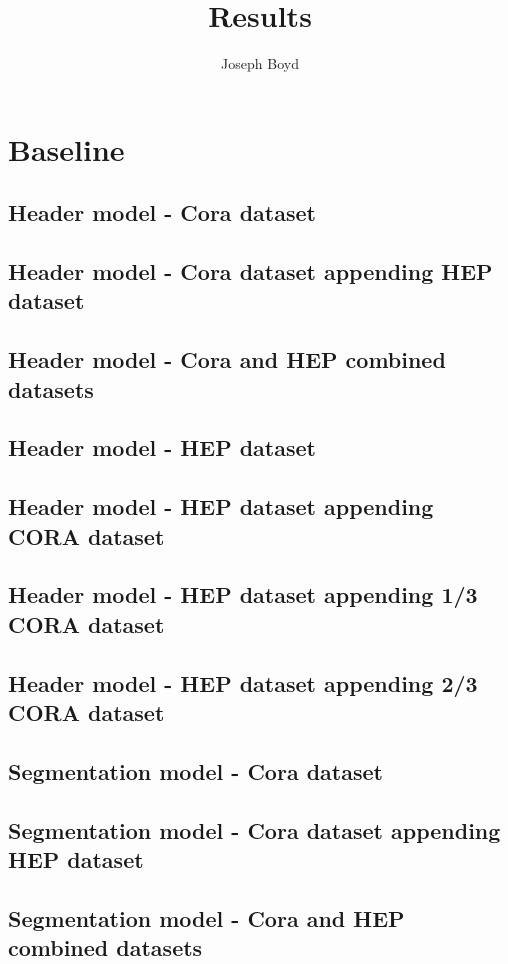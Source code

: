 \documentclass[11pt, oneside]{scrartcl}   	%
\title{Results}
\author{Joseph Boyd}
\begin{document}
\maketitle

\tableofcontents

\section{Baseline}
\subsection{Header model - Cora dataset}
\subsection{Header model - Cora dataset appending HEP dataset}
\subsection{Header model - Cora and HEP combined datasets}
\subsection{Header model - HEP dataset}
\subsection{Header model - HEP dataset appending CORA dataset}
\subsection{Header model - HEP dataset appending 1/3 CORA dataset}
\subsection{Header model - HEP dataset appending 2/3 CORA dataset}
\subsection{Segmentation model - Cora dataset}
\subsection{Segmentation model - Cora dataset appending HEP dataset}
\subsection{Segmentation model - Cora and HEP combined datasets}
\end{document}
